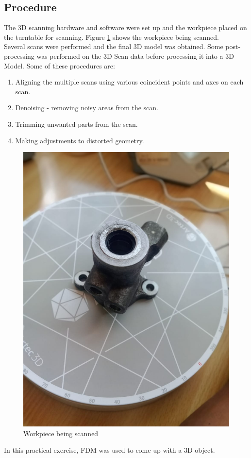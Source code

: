 \subsection{Procedure}
The 3D scanning hardware and software were set up and the workpiece placed on the turntable for scanning. Figure \ref{fig:scanning} shows the workpiece being scanned.\\
Several scans were performed and the final 3D model was obtained. Some post-processing was performed on the 3D Scan data before processing it into a 3D Model. Some of these procedures are:
\begin{enumerate}
	\item Aligning the multiple scans using various coincident points and axes on each scan.
	\item Denoising - removing noisy areas from the scan.
	\item Trimming unwanted parts from the scan.
	\item Making adjustments to distorted geometry.
\end{enumerate} 
\begin{center}
 	\begin{figure}[h!]
 	\centering
 	\includegraphics[width=0.4\linewidth]{Figures/Figure 2}
 	\caption[Scanning]{Workpiece being scanned}
 	\label{fig:scanning}
 	\end{figure}
 \end{center}
In this practical exercise, FDM was used to come up with a 3D object.
